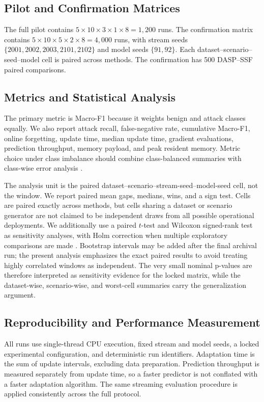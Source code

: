 \documentclass{ieeeaccess}
\begin{document}
\subsection{Pilot and Confirmation Matrices}
The full pilot contains $5\times10\times3\times1\times8=1{,}200$ runs. The confirmation matrix contains $5\times10\times5\times2\times8=4{,}000$ runs, with stream seeds $\{2001,2002,2003,2101,2102\}$ and model seeds $\{91,92\}$. Each dataset--scenario--seed--model cell is paired across methods. The confirmation has 500 DASP--SSF paired comparisons.

\subsection{Metrics and Statistical Analysis}
The primary metric is Macro-F1 because it weights benign and attack classes equally. We also report attack recall, false-negative rate, cumulative Macro-F1, online forgetting, update time, median update time, gradient evaluations, prediction throughput, memory payload, and peak resident memory. Metric choice under class imbalance should combine class-balanced summaries with class-wise error analysis \cite{Chen2024ImbalancedSurvey,Rainio2024Metrics}.

The analysis unit is the paired dataset--scenario--stream-seed--model-seed cell, not the window. We report paired mean gaps, medians, wins, and a sign test. Cells are paired exactly across methods, but cells sharing a dataset or scenario generator are not claimed to be independent draws from all possible operational deployments. We additionally use a paired $t$-test and Wilcoxon signed-rank test as sensitivity analyses, with Holm correction when multiple exploratory comparisons are made \cite{Rainio2024Metrics}. Bootstrap intervals may be added after the final archival run; the present analysis emphasizes the exact paired results to avoid treating highly correlated windows as independent. The very small nominal p-values are therefore interpreted as sensitivity evidence for the locked matrix, while the dataset-wise, scenario-wise, and worst-cell summaries carry the generalization argument.

\subsection{Reproducibility and Performance Measurement}
All runs use single-thread CPU execution, fixed stream and model seeds, a locked experimental configuration, and deterministic run identifiers. Adaptation time is the sum of update intervals, excluding data preparation. Prediction throughput is measured separately from update time, so a faster predictor is not conflated with a faster adaptation algorithm. The same streaming evaluation procedure is applied consistently across the full protocol.
\end{document}
